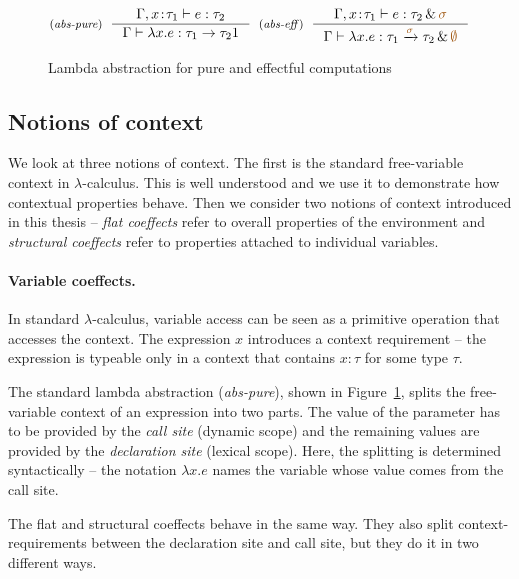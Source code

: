 
\begin{figure}
\[
\tyrule{abs-pure}
  { \Gamma, x\!:\!\tau_1 \vdash e : \tau_2}
  { \Gamma \vdash \lambda x.e : \tau_1 \rightarrow \tau_2 1}
\;\;
\tyrule{abs-eff}
  { \Gamma, x\!:\!\tau_1 \vdash e : \tau_2 \,\&\, \aclrd{\sigma} }
  { \Gamma \vdash \lambda x.e : \tau_1 \xrightarrow{\aclrd{\sigma}} \tau_2 \,\&\, \aclrd{\emptyset} }
\]
\caption{Lambda abstraction for pure and effectful computations}
\label{fig:applications-abs}
\end{figure}


\subsection{Notions of context}

We look at three notions of context. The first is the standard free-variable context in 
$\lambda$-calculus. This is well understood and we use it to demonstrate how contextual 
properties behave. Then we consider two notions of context introduced in this thesis --
\emph{flat coeffects} refer to overall properties of the environment and \emph{structural coeffects} 
refer to properties attached to individual variables. 

\paragraph{Variable coeffects.}

In standard $\lambda$-calculus, variable access can be seen as a primitive operation that 
accesses the context. The expression $x$ introduces a context requirement -- the expression 
is typeable only in a context that contains $x:\tau$ for some type $\tau$. 

The standard lambda abstraction (\emph{abs-pure}), shown in Figure~\ref{fig:applications-abs},
splits the free-variable context of an expression into two parts. The value of the parameter
has to be provided by the \emph{call site} (dynamic scope) and the remaining values are provided 
by the \emph{declaration site} (lexical scope). Here, the splitting is determined syntactically --
the notation $\lambda x.e$ names the variable whose value comes from the call site.

The flat and structural coeffects behave in the same way. They also split context-requirements
between the declaration site and call site, but they do it in two different ways.

